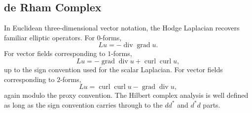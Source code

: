 \documentclass{article}
\newcommand{\todovk}[2][]{\todo[color=red!25,#1]{VK: #2}}
\DeclareMathOperator{\grad}{grad}
\DeclareMathOperator{\curl}{curl}
\DeclareMathOperator{\divergence}{div}
\begin{document}



\subsection{de Rham Complex}\label{sec:simplicial}

In Euclidean three-dimensional vector notation, the Hodge Laplacian recovers
familiar elliptic operators.  For $0$-forms,
\[
	L u
	=
	-\divergence \grad u.
\]
For vector fields corresponding to $1$-forms,
\[	L u
	=
	-\grad \divergence u
	+
	\curl \curl u,
\]
up to the sign convention used for the scalar Laplacian.  For vector fields
corresponding to $2$-forms,
\[	L u
	=
	\curl \curl u
	-
	\grad \divergence u,
\]
again modulo the proxy convention.  The Hilbert complex
analysis is well defined as long as the sign convention carries through to the $dd^*$ and
$d^*d$ parts.
\end{document}
